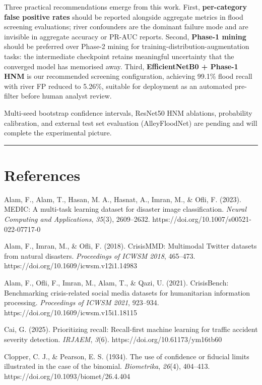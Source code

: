 \documentclass[
  11pt,
]{article}
\begin{document}
Three practical recommendations emerge from this work. First,
\textbf{per-category false positive rates} should be reported alongside
aggregate metrics in flood screening evaluations; river confounders are
the dominant failure mode and are invisible in aggregate accuracy or
PR-AUC reports. Second, \textbf{Phase-1 mining} should be preferred over
Phase-2 mining for training-distribution-augmentation tasks: the
intermediate checkpoint retains meaningful uncertainty that the
converged model has memorised away. Third, \textbf{EfficientNetB0 +
Phase-1 HNM} is our recommended screening configuration, achieving
99.1\% flood recall with river FP reduced to 5.26\%, suitable for
deployment as an automated pre-filter before human analyst review.

Multi-seed bootstrap confidence intervals, ResNet50 HNM ablations,
probability calibration, and external test set evaluation
(AlleyFloodNet) are pending and will complete the experimental picture.

\begin{center}\rule{0.5\linewidth}{0.5pt}\end{center}

\section{References}\label{references}

Alam, F., Alam, T., Hasan, M. A., Hasnat, A., Imran, M., \& Ofli, F.
(2023). MEDIC: A multi-task learning dataset for disaster image
classification. \emph{Neural Computing and Applications}, \emph{35}(3),
2609--2632. https://doi.org/10.1007/s00521-022-07717-0

Alam, F., Imran, M., \& Ofli, F. (2018). CrisisMMD: Multimodal Twitter
datasets from natural disasters. \emph{Proceedings of ICWSM 2018},
465--473. https://doi.org/10.1609/icwsm.v12i1.14983

Alam, F., Ofli, F., Imran, M., Alam, T., \& Qazi, U. (2021).
CrisisBench: Benchmarking crisis-related social media datasets for
humanitarian information processing. \emph{Proceedings of ICWSM 2021},
923--934. https://doi.org/10.1609/icwsm.v15i1.18115

Cai, G. (2025). Prioritizing recall: Recall-first machine learning for
traffic accident severity detection. \emph{IRJAEM}, \emph{3}(6).
https://doi.org/10.61173/ym16tb60

Clopper, C. J., \& Pearson, E. S. (1934). The use of confidence or
fiducial limits illustrated in the case of the binomial.
\emph{Biometrika}, \emph{26}(4), 404--413.
https://doi.org/10.1093/biomet/26.4.404
\end{document}
